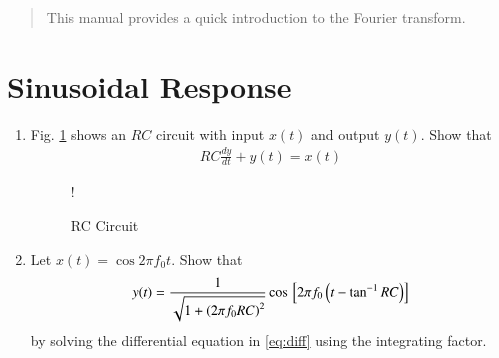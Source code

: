 \documentclass[journal,12pt,twocolumn]{IEEEtran}
\begin{document}
\tableofcontents

\bigskip

\renewcommand{\thefigure}{\theenumi}
\renewcommand{\thetable}{\theenumi}

\begin{abstract}
	This manual provides a quick introduction to the Fourier transform.
\end{abstract}
%
%
\section{Sinusoidal Response}
\begin{enumerate}[1.]
\item Fig. \ref{fig:rc} shows an $RC$ circuit with input $x(t)$ and output $y(t)$.  Show that
\begin{equation}
\label{eq:diff}
\begin{split}
RC\frac{dy}{dt} + y(t) = x(t)
\end{split}
\end{equation}
\begin{figure}[!h]
\centering
\resizebox {\columnwidth} {!} {

}
\caption{RC Circuit} 
\label{fig:rc}
\end{figure}
\item Let $x(t) = \cos 2\pi f_0 t$. Show that
\begin{equation}
\label{eq:yt}
y(t) = \frac{1}{\sqrt{1+\left(2\pi f_0 RC\right)^2}}\cos{}\left[2\pi f_0 \left(t - \tan^{-1}RC\right)  \right]
\end{equation}
by solving the differential equation in \eqref{eq:diff} using the integrating factor.
\begin{equation}
\begin{split}
%
\end{split}
\end{equation}
\end{enumerate}
\end{document}
